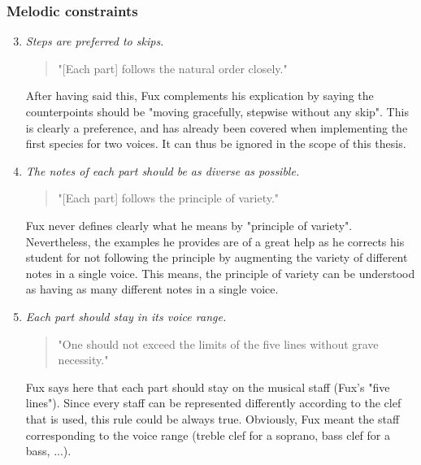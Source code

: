 \subsubsection{Melodic constraints}
\begin{enumerate}[wide, label=\bfseries 1.M\arabic*]
\setcounter{enumi}{2} %
    \item\label{rule:steps-prefered} \textit{Steps are preferred to skips.}

    \begin{quotation}
    "[Each part] follows the natural order closely."
    \textcite[p.73]{GaPEng}
    \end{quotation}

    After having said this, Fux complements his explication by saying the counterpoints should be "moving gracefully, stepwise without any skip". This is clearly a preference, and has already been covered when implementing the first species for two voices. It can thus be ignored in the scope of this thesis.

    \item\label{rule:variety} \reddot \textit{The notes of each part should be as diverse as possible.}

    \begin{quotation}
    "[Each part] follows the principle of variety."
    \textcite[p.73]{GaPEng}
    \end{quotation}

    Fux never defines clearly what he means by "principle of variety". Nevertheless, the examples he provides are of a great help as he corrects his student for not following the principle by augmenting the variety of different notes in a single voice. This means, the principle of variety can be understood as having as many different notes in a single voice. 

    \item\label{rule:template} \reddot \textit{Each part should stay in its voice range.}

    \begin{quotation}
    "One should not exceed the limits of the five lines without grave necessity."
    \textcite[p.79]{GaPEng}
    \end{quotation}

    Fux says here that each part should stay on the musical staff (Fux's "five lines"). Since every staff can be represented differently according to the clef that is used, this rule could be always true. Obviously, Fux meant the staff corresponding to the voice range (treble clef for a soprano, bass clef for a bass, ...). 
    

\end{enumerate}
